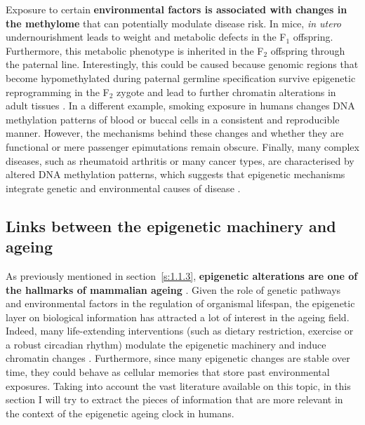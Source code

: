 \bigskip

Exposure to certain \textbf{environmental factors is associated with changes in the methylome} that can potentially modulate disease risk. In mice, \textit{in utero} undernourishment leads to weight and metabolic defects in the F$_1$ offspring. Furthermore, this metabolic phenotype is inherited in the F$_2$ offspring through the paternal line. Interestingly, this could be caused because genomic regions that become hypomethylated during paternal germline specification survive epigenetic reprogramming in the F$_2$ zygote and lead to further chromatin alterations in adult tissues \cite{Radford2014}. In a different example, smoking exposure in humans changes DNA methylation patterns of blood \cite{Roby2016} or buccal cells \cite{Teschendorff2015} in a consistent and reproducible manner. However, the mechanisms behind these changes and whether they are functional or mere passenger epimutations remain obscure. Finally, many complex diseases, such as rheumatoid arthritis or many cancer types, are characterised by altered DNA methylation patterns, which suggests that epigenetic mechanisms integrate genetic and environmental causes of disease \cite{Liu2013,Widschwendter2018}.

\smallskip

\subsection{Links between the epigenetic machinery and ageing} \label{s:1.2.3}

\smallskip

As previously mentioned in section~\ref{s:1.1.3}, \textbf{epigenetic alterations are one of the hallmarks of mammalian ageing} \cite{Lopez-Otin2013}. Given the role of genetic pathways and environmental factors in the regulation of organismal lifespan, the epigenetic layer on biological information has attracted a lot of interest in the ageing field. Indeed, many life-extending interventions (such as dietary restriction, exercise or a robust circadian rhythm) modulate the epigenetic machinery and induce chromatin changes \cite{Benayoun2015a}. Furthermore, since many epigenetic changes are stable over time, they could behave as cellular memories that store past environmental exposures. Taking into account the vast literature available on this topic, in this section I will try to extract the pieces of information that are more relevant in the context of the epigenetic ageing clock in humans.

